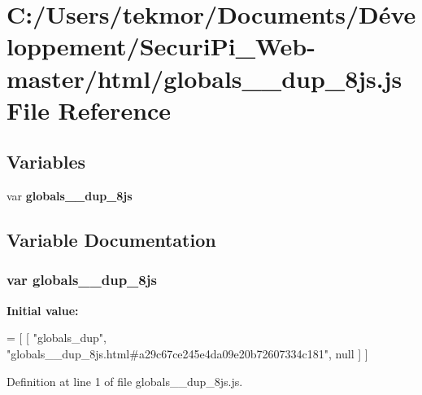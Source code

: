 \section{C\+:/\+Users/tekmor/\+Documents/\+Développement/\+Securi\+Pi\+\_\+\+Web-\/master/html/globals\+\_\+\+\_\+dup\+\_\+8js.js File Reference}
\label{globals____dup__8js_8js}
\subsection*{Variables}
\begin{DoxyCompactItemize}
\item 
var {\bf globals\+\_\+\+\_\+dup\+\_\+8js}
\end{DoxyCompactItemize}


\subsection{Variable Documentation}
\subsubsection[{globals\+\_\+\+\_\+dup\+\_\+8js}]{\setlength{\rightskip}{0pt plus 5cm}var globals\+\_\+\+\_\+dup\+\_\+8js}\label{globals____dup__8js_8js_ae8d009791dc8c0486f477430ea32c9c7}
{\bfseries Initial value\+:}
\begin{DoxyCode}
=
[
    [ \textcolor{stringliteral}{"globals\_dup"}, \textcolor{stringliteral}{"globals\_\_dup\_8js.html#a29c67ce245e4da09e20b72607334c181"}, null ]
]
\end{DoxyCode}


Definition at line 1 of file globals\+\_\+\+\_\+dup\+\_\+8js.\+js.

